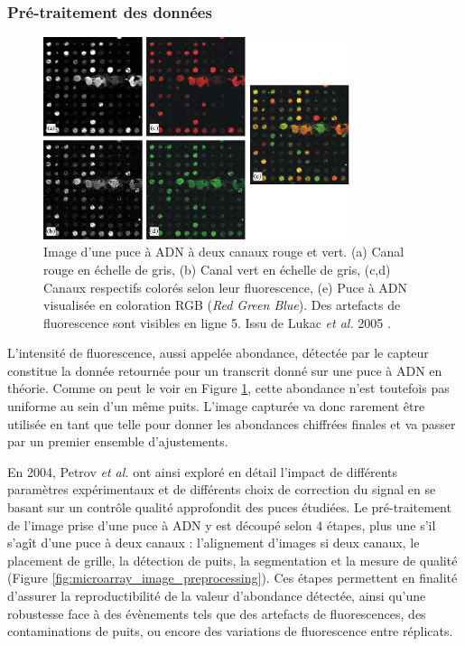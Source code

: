 

\subsubsection{Pré-traitement des données}

\begin{figure}[!h]
    \centering
    \includegraphics[width=0.8\textwidth]{img/intro/2_meth_transcripto/intro_2_true_microarray_picture_10.1016_j.fss.2004.10.012.png}
    \caption[Image d'une puce à ADN à deux canaux rouge et vert]{Image d'une puce à ADN à deux canaux rouge et vert. (a) Canal rouge en échelle de gris, (b) Canal vert en échelle de gris, (c,d) Canaux respectifs colorés selon leur fluorescence, (e) Puce à ADN visualisée en coloration RGB (\textit{Red Green Blue}). Des artefacts de fluorescence sont visibles en ligne 5. Issu de Lukac \textit{et al.} 2005 \cite{Lukac2005May}.}
    \label{fig:true_microarray_picture}
\end{figure}

L'intensité de fluorescence, aussi appelée abondance, détectée par le capteur constitue la donnée retournée pour un transcrit donné sur une puce à ADN en théorie. Comme on peut le voir en Figure \ref{fig:true_microarray_picture}, cette abondance n'est toutefois pas uniforme au sein d'un même puits. L'image capturée va donc rarement être utilisée en tant que telle pour donner les abondances chiffrées finales et va passer par un premier ensemble d'ajustements.

En 2004, Petrov \textit{et al.} \cite{Petrov2004Nov} ont ainsi exploré en détail l'impact de différents paramètres expérimentaux et de différents choix de correction du signal en se basant sur un contrôle qualité approfondit des puces étudiées. Le pré-traitement de l'image prise d'une puce à ADN y est découpé selon 4 étapes, plus une s'il s'agît d'une puce à deux canaux : l'alignement d'images si deux canaux, le placement de grille, la détection de puits, la segmentation et la mesure de qualité (Figure \ref{fig:microarray_image_preprocessing}). Ces étapes permettent en finalité d'assurer la reproductibilité de la valeur d'abondance détectée, ainsi qu'une robustesse face à des évènements tels que des artefacts de fluorescences, des contaminations de puits, ou encore des variations de fluorescence entre réplicats.

